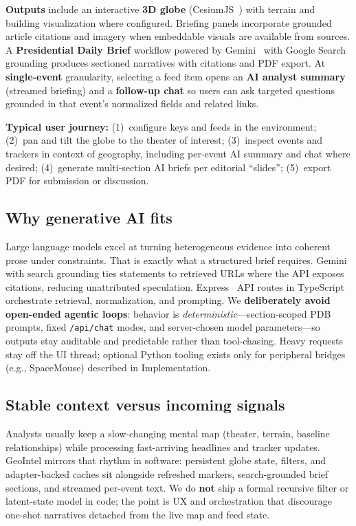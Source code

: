 \textbf{Outputs} include an interactive \textbf{3D globe} (CesiumJS~\cite{cesium}) with terrain and building visualization where configured. Briefing panels incorporate grounded article citations and imagery when embeddable visuals are available from sources. A \textbf{Presidential Daily Brief} workflow powered by Gemini~\cite{gemini-api} with Google Search grounding produces sectioned narratives with citations and PDF export. At \textbf{single-event} granularity, selecting a feed item opens an \textbf{AI analyst summary} (streamed briefing) and a \textbf{follow-up chat} so users can ask targeted questions grounded in that event's normalized fields and related links.

\textbf{Typical user journey:} (1)~configure keys and feeds in the environment; (2)~pan and tilt the globe to the theater of interest; (3)~inspect events and trackers in context of geography, including per-event AI summary and chat where desired; (4)~generate multi-section AI briefs per editorial ``slides''; (5)~export PDF for submission or discussion.

\subsection{Why generative AI fits}

Large language models excel at turning heterogeneous evidence into coherent prose under constraints.
That is exactly what a structured brief requires.
Gemini~\cite{gemini-api} with search grounding ties statements to retrieved URLs where the API exposes citations, reducing unattributed speculation.
Express~\cite{express} API routes in TypeScript orchestrate retrieval, normalization, and prompting. We \textbf{deliberately avoid open-ended agentic loops}: behavior is \emph{deterministic}---section-scoped PDB prompts, fixed \texttt{/api/chat} modes, and server-chosen model parameters---so outputs stay auditable and predictable rather than tool-chasing. Heavy requests stay off the UI thread; optional Python tooling exists only for peripheral bridges (e.g., SpaceMouse) described in Implementation.

\subsection{Stable context versus incoming signals}

Analysts usually keep a slow-changing mental map (theater, terrain, baseline relationships) while processing fast-arriving headlines and tracker updates. GeoIntel mirrors that rhythm in software: persistent globe state, filters, and adapter-backed caches sit alongside refreshed markers, search-grounded brief sections, and streamed per-event text. We do \textbf{not} ship a formal recursive filter or latent-state model in code; the point is UX and orchestration that discourage one-shot narratives detached from the live map and feed state.

